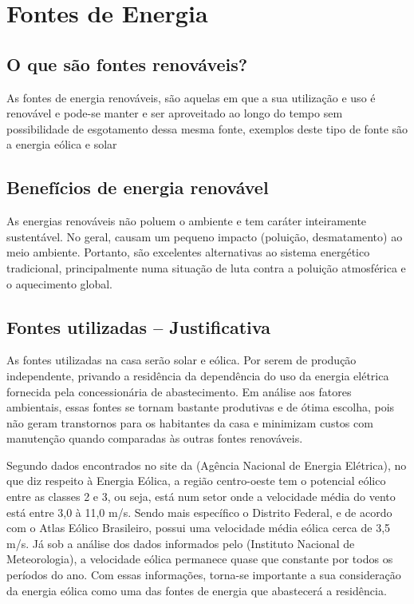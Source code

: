 \section{Fontes de Energia}

\subsection{O que são fontes renováveis?}

	As fontes de energia renováveis, são aquelas em que a sua utilização e uso é renovável e pode-se manter e ser aproveitado ao longo do tempo sem possibilidade de esgotamento dessa mesma fonte, exemplos deste tipo de fonte são a energia eólica e solar\cite{2007RevUSP}

\subsection{Benefícios de energia renovável}

	As energias renováveis não poluem o ambiente e tem caráter inteiramente sustentável. No geral, causam um pequeno impacto (poluição, desmatamento) ao meio ambiente. Portanto, são excelentes alternativas ao sistema energético tradicional, principalmente numa situação de luta contra a poluição atmosférica e o aquecimento global.

\subsection{Fontes utilizadas -- Justificativa}

	As fontes utilizadas na casa serão solar e eólica. Por serem de produção independente, privando a residência da dependência do uso da energia elétrica fornecida pela concessionária de abastecimento. Em análise aos fatores ambientais, essas fontes se tornam bastante produtivas e de ótima escolha, pois não geram transtornos para os habitantes da casa e minimizam custos com manutenção quando comparadas às outras fontes renováveis.

	Segundo dados encontrados no site da \cite{2013Aneel} (Agência Nacional de Energia Elétrica), no que diz respeito à Energia Eólica, a região centro-oeste tem o potencial eólico entre as classes 2 e 3, ou seja, está num setor onde a velocidade média do vento está entre 3,0 à 11,0 m/s. Sendo mais específico o Distrito Federal, e de acordo com o Atlas Eólico Brasileiro, possui uma velocidade média eólica cerca de 3,5 m/s. Já sob a análise dos dados informados pelo \cite{INMET} (Instituto Nacional de Meteorologia), a velocidade eólica permanece quase que constante por todos os períodos do ano. Com essas informações, torna-se importante a sua consideração da energia eólica como uma das fontes de energia que abastecerá a residência.

